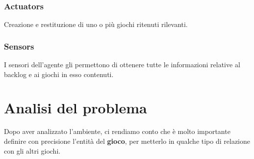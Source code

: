     \subsubsection{Actuators}
        Creazione e restituzione di uno o più giochi ritenuti rilevanti.
        
    \subsubsection{Sensors}
        I sensori dell'agente gli permettono di ottenere tutte le informazioni relative al backlog e ai giochi in esso contenuti.
        
\section{Analisi del problema}
    Dopo aver analizzato l'ambiente, ci rendiamo conto che è molto importante definire con precisione l'entità del \textbf{gioco}, per metterlo in qualche tipo di relazione con gli altri giochi.
    
